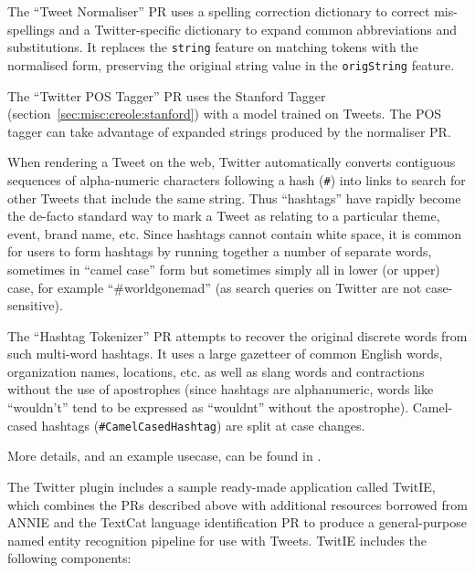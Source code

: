 The ``Tweet Normaliser'' PR uses a spelling correction dictionary to correct
mis-spellings and a Twitter-specific dictionary to expand common abbreviations
and substitutions.  It replaces the \verb!string! feature on matching tokens
with the normalised form, preserving the original string value in the
\verb!origString! feature.

The ``Twitter POS Tagger'' PR uses the Stanford Tagger
(section~\ref{sec:misc:creole:stanford}) with a model trained on Tweets.  The
POS tagger can take advantage of expanded strings produced by the normaliser
PR.


When rendering a Tweet on the web, Twitter automatically converts contiguous
sequences of alpha-numeric characters following a hash (\verb!#!) into links
to search for other Tweets that include the same string.  Thus ``hashtags''
have rapidly become the de-facto standard way to mark a Tweet as relating to a
particular theme, event, brand name, etc.  Since hashtags cannot contain white
space, it is common for users to form hashtags by running together a number of
separate words, sometimes in ``camel case'' form but sometimes simply all in
lower (or upper) case, for example ``\#worldgonemad'' (as search queries on
Twitter are not case-sensitive).

The ``Hashtag Tokenizer'' PR attempts to recover the original discrete words
from such multi-word hashtags.  It uses a large gazetteer of common English
words, organization names, locations, etc. as well as slang words and
contractions without the use of apostrophes (since hashtags are alphanumeric,
words like ``wouldn't'' tend to be expressed as ``wouldnt'' without the
apostrophe).  Camel-cased hashtags (\verb!#CamelCasedHashtag!) are split at
case changes.

More details, and an example usecase, can be found in \cite{Maynard14a}.


The Twitter plugin includes a sample ready-made application called TwitIE,
which combines the PRs described above with additional resources borrowed from
ANNIE and the TextCat language identification PR to produce a general-purpose
named entity recognition pipeline for use with Tweets.  TwitIE includes the
following components:

